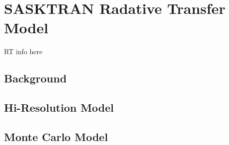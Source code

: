 \section{SASKTRAN Radative Transfer Model}
\label{sec:4.1:Sasktran}

RT info here

\subsection{Background}
\subsection{Hi-Resolution Model}
\subsection{Monte Carlo Model}

